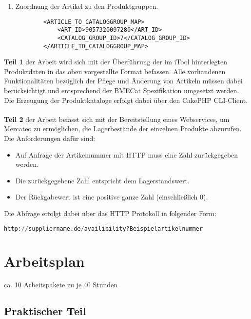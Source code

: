 \begin{enumerate}
		\item Zuordnung der Artikel zu den Produktgruppen.
		\begin{lstlisting}
		<ARTICLE_TO_CATALOGGROUP_MAP>
			<ART_ID>9057320097280</ART_ID>
			<CATALOG_GROUP_ID>7</CATALOG_GROUP_ID>
		</ARTICLE_TO_CATALOGGROUP_MAP>
		\end{lstlisting}
	
	\end{enumerate}
	
	\textbf{Teil 1} der Arbeit wird sich mit der Überführung der im iTool hinterlegten Produktdaten in das oben vorgestellte Format befassen. Alle vorhandenen Funktionalitäten bezüglich der Pflege und Änderung von Artikeln müssen dabei berücksichtigt und entsprechend der BMECat Spezifikation umgesetzt werden. Die Erzeugung der Produktkataloge erfolgt dabei über den CakePHP CLI-Client.  \\\\



	\textbf{Teil 2} der Arbeit befasst sich mit der Bereitstellung eines Webservices, um Mercateo zu ermöglichen, die Lagerbestände der einzelnen Produkte abzurufen.\\
	Die Anforderungen dafür sind:
	
	\begin{itemize}
	\item Auf Anfrage der Artikelnummer mit HTTP muss eine Zahl zurückgegeben werden.
	\item Die zurückgegebene Zahl entspricht dem Lagerstandswert.
	\item Der Rückgabewert ist eine positive ganze Zahl (einschließlich 0).


	\end{itemize}
	
	Die Abfrage erfolgt dabei über das HTTP Protokoll in folgender Form:
	\begin{lstlisting}[language=Python]						
		http://suppliername.de/availibility?Beispielartikelnummer
	\end{lstlisting}
	
	
	
\pagebreak	
	
\section{Arbeitsplan}

ca. 10 Arbeitspakete zu je 40 Stunden
\subsection{Praktischer Teil}

